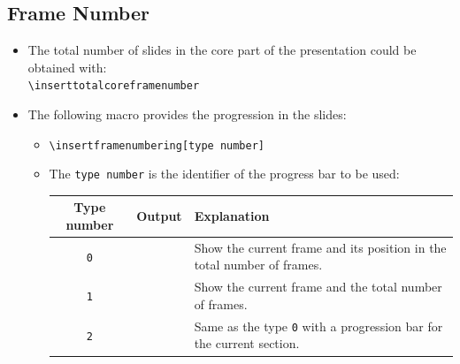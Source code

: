 \documentclass[english,circlenumberstyle]{irtesbeamer}
\begin{document}
\subsection{Frame Number}
\begin{frame}[label=progressbartypes]{\subsecname}\tiny
	\begin{itemize}
	\item The total number of slides in the core part of the presentation could be obtained with: \\
		\texttt{{\textbackslash}inserttotalcoreframenumber}
	\item The following macro provides the progression in the slides:
		\begin{itemize}
		\item \texttt{{\textbackslash}insertframenumbering[type number]}
		\item The \texttt{type number} is the identifier of the progress bar to be used:
			\begin{tabularx}{\linewidth}{|c|c|X|}
			\hline
			\textbf{Type number} & \textbf{Output} & \textbf{Explanation} \\
			\hline
			\texttt{0} & \insertframenumbering[0] & Show the current frame and its position in the total number of frames. \\
			\hline
			\texttt{1} & \colorbox{IRTESlightblue}{\insertframenumbering[1]} & Show the current frame and the total number of frames. \\
			\hline
			\texttt{2} & \insertframenumbering[2] & Same as the type \texttt{0} with a progression bar for the current section. \\
			\hline
			\end{tabularx}
		\end{itemize}
	\end{itemize}
\end{frame}
\end{document}
